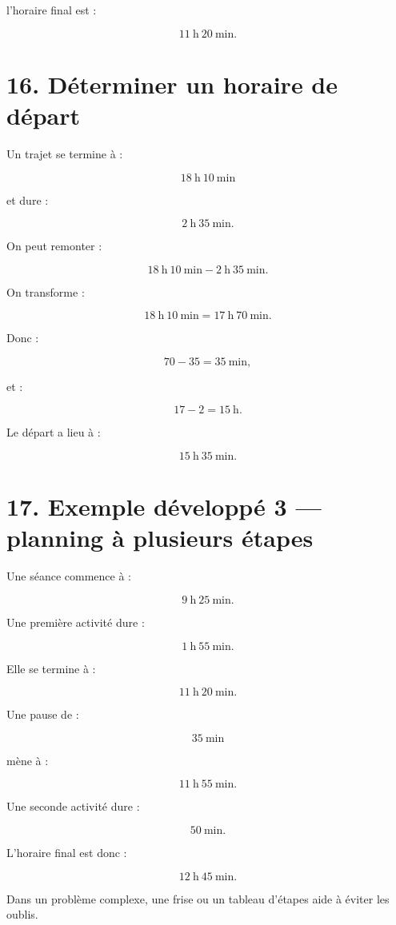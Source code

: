 l’horaire final est :

\[
\boxed{
11\ \text{h}\ 20\ \text{min}
}.
\]

\section{16. Déterminer un horaire de départ}

Un trajet se termine à :

\[
18\ \text{h}\ 10\ \text{min}
\]

et dure :

\[
2\ \text{h}\ 35\ \text{min}.
\]

On peut remonter :

\[
18\ \text{h}\ 10\ \text{min}
-
2\ \text{h}\ 35\ \text{min}.
\]

On transforme :

\[
18\ \text{h}\ 10\ \text{min}
=
17\ \text{h}\ 70\ \text{min}.
\]

Donc :

\[
70-35=35\ \text{min},
\]

et :

\[
17-2=15\ \text{h}.
\]

Le départ a lieu à :

\[
\boxed{
15\ \text{h}\ 35\ \text{min}
}.
\]

\section{17. Exemple développé 3 — planning à plusieurs étapes}

Une séance commence à :

\[
9\ \text{h}\ 25\ \text{min}.
\]

Une première activité dure :

\[
1\ \text{h}\ 55\ \text{min}.
\]

Elle se termine à :

\[
11\ \text{h}\ 20\ \text{min}.
\]

Une pause de :

\[
35\ \text{min}
\]

mène à :

\[
11\ \text{h}\ 55\ \text{min}.
\]

Une seconde activité dure :

\[
50\ \text{min}.
\]

L’horaire final est donc :

\[
\boxed{
12\ \text{h}\ 45\ \text{min}
}.
\]

Dans un problème complexe, une frise ou un tableau d’étapes aide à éviter les oublis.

